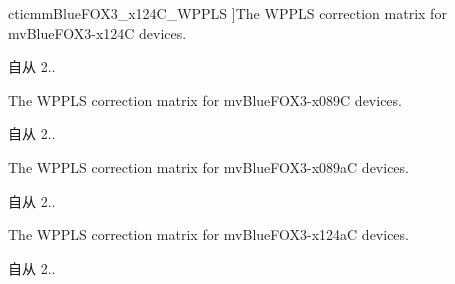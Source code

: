 \begin{Desc}
\begin{description}
{\hypertarget{group___common_interface_gga514bdc683ef27995fdeba04aec25f571a5b0030c0cbf921224f26f671b77ba530}{cticmm\+Blue\+F\+O\+X3\+\_\+x124\+C\+\_\+\+W\+P\+P\+L\+S}\label{group___common_interface_gga514bdc683ef27995fdeba04aec25f571a5b0030c0cbf921224f26f671b77ba530}
}]The W\+P\+P\+L\+S correction matrix for mv\+Blue\+F\+O\+X3-\/x124\+C devices. \begin{DoxySince}{自从}
2.. 
\end{DoxySince}
\item[{\em 
\hypertarget{group___common_interface_gga514bdc683ef27995fdeba04aec25f571a4a387aafd6c1a901330d28c4541fa9d5}{cticmm\+Blue\+F\+O\+X3\+\_\+x089\+C\+\_\+\+W\+P\+P\+L\+S}\label{group___common_interface_gga514bdc683ef27995fdeba04aec25f571a4a387aafd6c1a901330d28c4541fa9d5}
}]The W\+P\+P\+L\+S correction matrix for mv\+Blue\+F\+O\+X3-\/x089\+C devices. \begin{DoxySince}{自从}
2.. 
\end{DoxySince}
\item[{\em 
\hypertarget{group___common_interface_gga514bdc683ef27995fdeba04aec25f571ab48e75f90964aa9ee719a5bb38ad57bb}{cticmm\+Blue\+F\+O\+X3\+\_\+x089a\+C\+\_\+\+W\+P\+P\+L\+S}\label{group___common_interface_gga514bdc683ef27995fdeba04aec25f571ab48e75f90964aa9ee719a5bb38ad57bb}
}]The W\+P\+P\+L\+S correction matrix for mv\+Blue\+F\+O\+X3-\/x089a\+C devices. \begin{DoxySince}{自从}
2.. 
\end{DoxySince}
\item[{\em 
\hypertarget{group___common_interface_gga514bdc683ef27995fdeba04aec25f571ad62d57214ee87cfbe904b66b9e1cab29}{cticmm\+Blue\+F\+O\+X3\+\_\+x124a\+C\+\_\+\+W\+P\+P\+L\+S}\label{group___common_interface_gga514bdc683ef27995fdeba04aec25f571ad62d57214ee87cfbe904b66b9e1cab29}
}]The W\+P\+P\+L\+S correction matrix for mv\+Blue\+F\+O\+X3-\/x124a\+C devices. \begin{DoxySince}{自从}
2.. 
\end{DoxySince}
\end{description}
\end{Desc}
